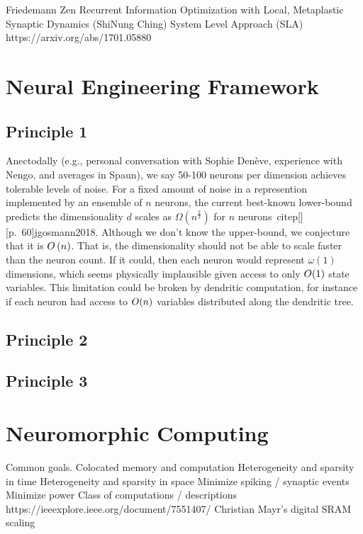 Friedemann Zen
Recurrent Information Optimization with Local, Metaplastic Synaptic Dynamics (ShiNung Ching)
System Level Approach (SLA) https://arxiv.org/abs/1701.05880


\section{Neural Engineering Framework}

\subsection{Principle 1}

Anectodally (e.g., personal conversation with Sophie Den\`eve, experience with Nengo, and averages in Spaun), we say 50-100 neurons per dimension achieves tolerable levels of noise.
For a fixed amount of noise in a represention implemented by an ensemble of $n$ neurons, the current best-known lower-bound predicts the dimensionality $d$ scales as $\Omega \left( n^{\frac{2}{3}} \right)$ for $n$ neurons~citep[][p.~60]{jgosmann2018}.
Although we don't know the upper-bound, we conjecture that it is $O \left( n \right)$.
That is, the dimensionality should not be able to scale faster than the neuron count.
If it could, then each neuron would represent $\omega(1)$ dimensions, which seems physically implausible given access to only $O (1)$ state variables.
This limitation could be broken by dendritic computation, for instance if each neuron had access to $O (n)$ variables distributed along the dendritic tree.

\subsection{Principle 2}

\subsection{Principle 3}


\section{Neuromorphic Computing}

Common goals.
Colocated memory and computation
Heterogeneity and sparsity in time
Heterogeneity and sparsity in space
Minimize spiking / synaptic events
Minimize power
Class of computations / descriptions
https://ieeexplore.ieee.org/document/7551407/ Christian Mayr's digital SRAM scaling 

